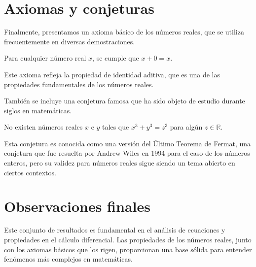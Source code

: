 \section{Axiomas y conjeturas}

Finalmente, presentamos un axioma básico de los números reales, que se utiliza frecuentemente en diversas demostraciones.

\begin{axiom}
Para cualquier número real $x$, se cumple que $x + 0 = x$.
\end{axiom}

Este axioma refleja la propiedad de identidad aditiva, que es una de las propiedades fundamentales de los números reales.

También se incluye una conjetura famosa que ha sido objeto de estudio durante siglos en matemáticas.

\begin{conjecture}
No existen números reales $x$ e $y$ tales que $x^3 + y^3 = z^3$ para algún $z \in \mathbb{R}$.
\end{conjecture}

Esta conjetura es conocida como una versión del Último Teorema de Fermat, una conjetura que fue resuelta por Andrew Wiles en 1994 para el caso de los números enteros, pero su validez para números reales sigue siendo un tema abierto en ciertos contextos.

\section{Observaciones finales}

\begin{remark}
Este conjunto de resultados es fundamental en el análisis de ecuaciones y propiedades en el cálculo diferencial. Las propiedades de los números reales, junto con los axiomas básicos que los rigen, proporcionan una base sólida para entender fenómenos más complejos en matemáticas.
\end{remark}

